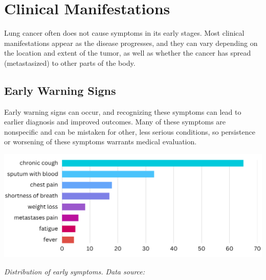 
\section{Clinical Manifestations}

Lung cancer often does not cause symptoms in its early stages. Most clinical manifestations appear 
as the disease progresses, and they can vary depending on the location and extent of the tumor, as 
well as whether the cancer has spread (metastasized) to other parts of the body.


\subsection{Early Warning Signs}

Early warning signs can occur, and recognizing these symptoms can lead to earlier diagnosis and 
improved outcomes. Many of these symptoms are nonspecific and can be mistaken for other, less 
serious conditions, so persistence or worsening of these symptoms warrants medical evaluation.


\vspace{1em}
\begin{center}
    \includegraphics[width=\textwidth]{../assets/03-clinical/early-signs.png}  

    \small\textit{Distribution of early symptoms. Data source: \cite{cm2019}}
\end{center}
\vspace{1em}

